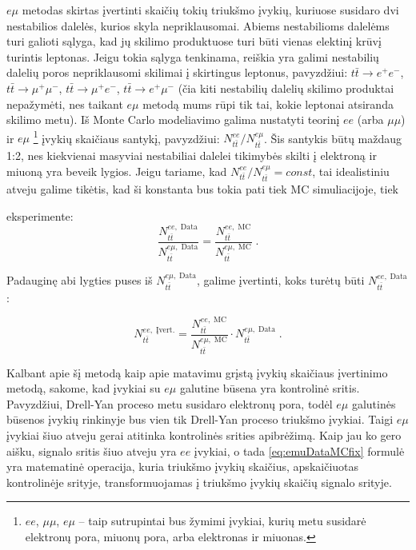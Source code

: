 \documentclass[a4paper, 12pt]{article}
\newcommand{\emu}{e\mu}
\newcommand{\mumu}{\mu\mu}
\newlength\q
\begin{document}
$e\mu$ metodas skirtas įvertinti skaičių tokių triukšmo įvykių, kuriuose susidaro dvi
nestabilios dalelės, kurios skyla nepriklausomai.
Abiems nestabilioms dalelėms turi galioti sąlyga, kad jų skilimo produktuose turi būti
vienas elektinį krūvį turintis leptonas.
Jeigu tokia sąlyga tenkinama, reiškia yra galimi nestabilių dalelių poros nepriklausomi
skilimai į skirtingus leptonus, pavyzdžiui: $t\bar{t}\rightarrow e^{+}e^{-}$,
$t\bar{t}\rightarrow\mu^{+}\mu^{-}$, $t\bar{t}\rightarrow\mu^{+}e^{-}$,
$t\bar{t}\rightarrow e^{+}\mu^{-}$ (čia kiti nestabilių dalelių skilimo produktai
nepažymėti, nes taikant $e\mu$ metodą mums rūpi tik tai, kokie leptonai atsiranda
skilimo metu).
Iš Monte Carlo modeliavimo galima nustatyti teorinį $ee$ (arba $\mumu$) ir $e\mu$
	\footnote{$ee$, $\mumu$, $\emu$ -- taip sutrupintai bus žymimi įvykiai, kurių
	metu susidarė elektronų pora, miuonų pora, arba elektronas ir miuonas.}
įvykių skaičiaus santykį, pavyzdžiui: $N_{t\bar{t}}^{ee}/N_{t\bar{t}}^{e\mu}$.
Šis santykis būtų maždaug 1:2, nes kiekvienai masyviai nestabiliai dalelei tikimybės
skilti į elektroną ir miuoną yra beveik lygios.
Jeigu tariame, kad $N_{t\bar{t}}^{ee}/N_{t\bar{t}}^{e\mu}=const$, tai idealistiniu
atveju galime tikėtis, kad ši konstanta bus tokia pati tiek MC simuliacijoje, tiek

eksperimente:
\begin{equation}
	\frac{ N_{t\bar{t}}^{ee , \; \mathrm{Data}} } { N_{t\bar{t}}^{e\mu , \; \mathrm{Data}} }
	= \frac{ N_{t\bar{t}}^{ee , \; \mathrm{MC}} }{ N_{t\bar{t}}^{e\mu , \; \mathrm{MC}} } \; .
	\label{eq:emuDataMC}
\end{equation}

Padauginę abi lygties puses iš $N_{t\bar{t}}^{e\mu , \; \mathrm{Data}}$, galime įvertinti,
koks turėtų būti $N_{t\bar{t}}^{ee , \; \mathrm{Data}}$:

\begin{equation}
N_{t\bar{t}}^{ee , \; \mathrm{Įvert.}}=\frac{N_{t\bar{t}}^{ee , \; \mathrm{MC}}}{N_{t\bar{t}}^{e\mu , \; \mathrm{MC}}}\cdot N_{t\bar{t}}^{e\mu , \; \mathrm{Data}} \; .
\label{eq:emuDataMCfix}
\end{equation}

Kalbant apie šį metodą kaip apie matavimu grįstą įvykių skaičiaus įvertinimo metodą, sakome,
kad įvykiai su $e\mu$ galutine būsena yra kontrolinė sritis.
Pavyzdžiui, Drell-Yan proceso metu susidaro elektronų pora, todėl $e\mu$ galutinės būsenos
įvykių rinkinyje bus vien tik Drell-Yan proceso triukšmo įvykiai.
Taigi $e\mu$ įvykiai šiuo atveju gerai atitinka kontrolinės srities apibrėžimą. Kaip jau ko
gero aišku, signalo sritis šiuo atveju yra $ee$ įvykiai, o tada \eqref{eq:emuDataMCfix}
formulė yra matematinė operacija, kuria triukšmo įvykių skaičius, apskaičiuotas kontrolinėje
srityje, transformuojamas į triukšmo įvykių skaičių signalo srityje.
\end{document}
